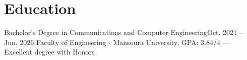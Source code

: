 \section{Education}
\resumeSubHeadingListStart
\resumeSubheading
{Bachelor's Degree in Communications and Computer Engineering}{Oct. 2021 -- Jun. 2026}
{Faculty of Engineering - Mansoura University, GPA: 3.84/4 --- Excellent degree with Honors}{}
\resumeSubHeadingListEnd